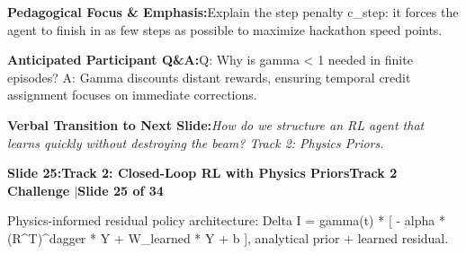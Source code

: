 \documentclass[11pt,a4paper]{article}
\begin{document}
\begin{tcolorbox}[colback=lightbg,colframe=bordergray,left=6pt,right=6pt,top=3pt,bottom=3pt,boxrule=0.6pt,arc=2.5pt]
\small
\noindent\textbf{\color{navy}Pedagogical Focus \& Emphasis:}\enspace Explain the step penalty c\_step: it forces the agent to finish in as few steps as possible to maximize hackathon speed points.\par\vspace{0.3em}
\noindent\textbf{\color{successgreen}Anticipated Participant Q\&A:}\enspace Q: Why is gamma < 1 needed in finite episodes? A: Gamma discounts distant rewards, ensuring temporal credit assignment focuses on immediate corrections.\par\vspace{0.3em}
\noindent\textbf{\color{accent}Verbal Transition to Next Slide:}\enspace \emph{How do we structure an RL agent that learns quickly without destroying the beam? Track 2: Physics Priors.}
\end{tcolorbox}
\clearpage
\hypertarget{slide.25}{}
{}
\noindent\begin{tcolorbox}[colback=navy,colframe=navy,left=6pt,right=6pt,top=3pt,bottom=3pt,boxrule=0pt,arc=2pt]
{\large\bfseries\color{white}Slide 25:\enspace Track 2: Closed-Loop RL with Physics Priors}\hfill{\footnotesize\bfseries\color{white!85!lightbg}Track 2 Challenge \enspace$|$\enspace Slide 25 of 34}
\end{tcolorbox}
\vspace{0.2em}
\begin{tcolorbox}[colback=lightbg,colframe=bordergray,title={\footnotesize\bfseries\color{darkgray}Slide Visual Blueprint},fontupper=\small,left=6pt,right=6pt,top=2.5pt,bottom=2.5pt,boxrule=0.6pt,arc=2.5pt]
Physics-informed residual policy architecture: Delta I = gamma(t) * [ - alpha * (R\textasciicircum{}T)\textasciicircum{}dagger * Y + W\_learned * Y + b ], analytical prior + learned residual.
\end{tcolorbox}
\vspace{0.2em}
\end{document}
